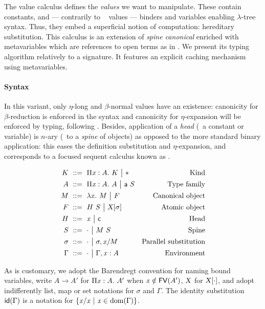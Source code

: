 \documentclass[9pt]{sigplanconf}
\begin{document}
The value calculus defines the \emph{values} we want to
manipulate. These contain constants, and --- contrarily to \eg\
 values --- binders and variables enabling $\lambda$-tree
syntax. Thus, they embed a superficial notion of computation:
hereditary substitution. This calculus is an extension of \emph{spine
  canonical \LF} \cite{pfenning2007term} enriched with metavariables
which are references to open terms as in
\cite{nanevski2008contextual}. We present its typing algorithm
relatively to a signature. It features an explicit caching mechanism
using metavariables.

\paragraph{Syntax}

In this variant, only $\eta$-long and $\beta$-normal values have an
existence: canonicity for $\beta$-reduction is enforced in the syntax
and canonicity for $\eta$-expansion will be enforced by typing,
following \cite{hl07mechanizing}. Besides, application of a
\emph{head} (\ie\ a constant or variable) is $n$-ary (\ie\ to a
\emph{spine} of objects) as opposed to the more standard binary
application: this eases the definition substitution and
$\eta$-expansion, and corresponds to a focused sequent calculus known
as \sysname{LJT} \cite{herbelin1995λ}.

\begin{align*}
  K &\ ::=\ 
  \Pi{\ensuremath{\text{\textit{x}}}}:{A}.\  K \ {\big|}\ 
  \mathsf{*} &
  \text{Kind}\\
  A &\ ::=\ 
  \Pi{\ensuremath{\text{\textit{x}}}}:{A}.\  A \ {\big|}\ 
  {\text{\textsf{a}}}\  S &
  \text{Type family} \\
  M &\ ::=\ 
  \lambda{\ensuremath{\text{\textit{x}}}}.\  M \ {\big|}\ 
  F &
  \text{Canonical object} \\
  F &\ ::=\  {H}\  S
  \ {\big|}\ 
  {\text{\textsl{X}}}[{\sigma}] &
  \text{Atomic object} \\
  H &\ ::=\ 
  \text{\textit{x}} \ {\big|}\ 
  \text{\textsf{c}} &
  \text{Head}\\
  S &\ ::=\ 
  \cdot \ {\big|}\ 
  {M}\ {S} &
  \text{Spine}\\
  \sigma &\ ::=\ 
  \cdot \ {\big|}\ 
  {\sigma},{{\text{\textit{x}}}/{M}} &
  \text{Parallel substitution} \\
  \Gamma &\ ::=\ 
  \cdot \ {\big|}\ 
  {\Gamma},{{\text{\textit{x}}}:{A}} &
  \text{Environment}
\end{align*}

As is customary, we adopt the Barendregt convention for naming bound
variables, write $A\to A'$ for $\Pi{\ensuremath{\text{\textit{x}}}}:{A}.\  A'$ when $\text{\textit{x}}\notin {\text{\textsf{FV}}}({A'})$,
$\text{\textsl{X}}$ for ${\text{\textsl{X}}}[{\cdot}]$, and adopt indifferently list, map
or set notations for $\sigma$ and $\Gamma$. The identity substitution
${\text{\textsf{id}}}({\Gamma})$ is a notation for $\{{\text{\textit{x}}}/{\text{\textit{x}}}\ |\ \text{\textit{x}}
\in\operatorname{dom}{\!(\Gamma)}\}$.
\end{document}
